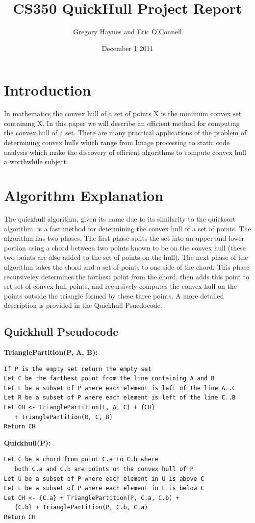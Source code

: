 \documentclass[11pt]{article}
\title{CS350 QuickHull Project Report}
\author{Gregory Haynes and Eric O'Connell}
\date{December 1 2011}
\begin{document}
\maketitle

\section{Introduction}

In mathematics the convex hull of a set of points X is the minimum convex set containing X. In this paper we will describe an efficient method for computing the convex hull of a set\cite{Wikipedia:QH}. There are many practical applications of the problem of determining convex hulls which range from Image processing to static code analysis which make the discovery of efficient algorithms to compute convex hull a worthwhile subject.

\section{Algorithm Explanation}

The quickhull algorithm, given its name due to its similarity to the quicksort algorithm, is a fast method for determining the convex hull of a set of points. The algorithm has two phases. The first phase splits the set into an upper and lower portion using a chord between two points known to be on the convex hull (these two points are also added to the set of points on the hull). The next phase of the algorithm takes the chord and a set of points to one side of the chord. This phase recursiveley determines the farthest point from the chord, then adds this point to set set of convex hull points, and recursively computes the convex hull on the points outside the triangle formed by these three points. A more detailed description is provided in the Quickhull Psuedocode.

\subsection{Quickhull Pseudocode}

\textbf{TrianglePartition(P, A, B):}
\begin{verbatim}
If P is the empty set return the empty set
Let C be the farthest point from the line containing A and B
Let L be a subset of P where each element is left of the line A..C
Let R be a subset of P where each element is left of the line C..B
Let CH <- TrianglePartition(L, A, C) + {CH}
   + TrianglePartition(R, C, B)
Return CH
\end{verbatim}
\textbf{Quickhull(P):}
\begin{verbatim}
Let C be a chord from point C.a to C.b where 
   both C.a and C.b are points on the convex hull of P
Let U be a subset of P where each element in U is above C
Let L be a subset of P where each element in L is below C
Let CH <- {C.a} + TrianglePartition(P, C.a, C.b) + 
   {C.b} + TrianglePartition(P, C.b, C.a)
Return CH
\end{verbatim}
\end{document}
